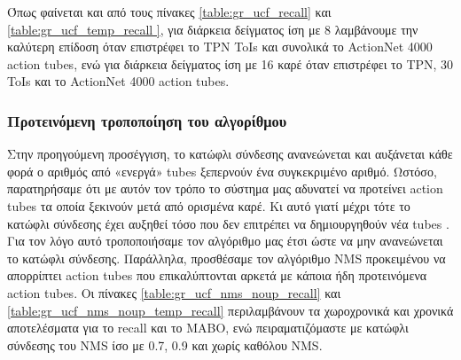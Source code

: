 Όπως φαίνεται και από τους πίνακες \ref{table:gr_ucf_recall} και \ref{table:gr_ucf_temp_recall }, για διάρκεια δείγματος ίση με 8 λαμβάνουμε
την καλύτερη επίδοση όταν επιστρέφει το \en TPN  \en ToIs \gr και συνολικά το \en ActionNet  4000  action tubes\gr, ενώ
για διάρκεια δείγματος ίση με 16 καρέ όταν επιστρέφει το \en TPN, 30 ToIs \gr και το \en ActionNet  4000 action tubes.\gr \par

\subsubsection{Προτεινόμενη τροποποίηση του αλγορίθμου}

Στην προηγούμενη προσέγγιση, το κατώφλι σύνδεσης ανανεώνεται και αυξάνεται κάθε φορά ο αριθμός από «ενεργά» \en tubes \gr ξεπερνούν ένα
συγκεκριμένο αριθμό. Ωστόσο, παρατηρήσαμε ότι με αυτόν τον τρόπο το σύστημα μας αδυνατεί να προτείνει \en action tubes \gr τα οποία ξεκινούν
μετά από ορισμένα καρέ. Κι αυτό γιατί μέχρι τότε το κατώφλι σύνδεσης έχει αυξηθεί τόσο που δεν επιτρέπει να δημιουργηθούν νέα \en tubes \gr.
Για τον λόγο αυτό τροποποιήσαμε τον αλγόριθμο μας έτσι ώστε να μην ανανεώνεται το κατώφλι σύνδεσης. Παράλληλα, προσθέσαμε τον αλγόριθμο
\en NMS \gr προκειμένου να απορρίπτει \en action tubes \gr που επικαλύπτονται αρκετά με κάποια ήδη προτεινόμενα \en action tubes\gr.
Οι πίνακες \ref{table:gr_ucf_nms_noup_recall} και  \ref{table:gr_ucf_nms_noup_temp_recall} περιλαμβάνουν τα χωροχρονικά και χρονικά αποτελέσματα
για το \en recall \gr και το \en MABO\gr, ενώ πειραματιζόμαστε με κατώφλι σύνδεσης του \en NMS \gr ίσο με 0.7, 0.9 και χωρίς καθόλου \en
NMS\gr.


